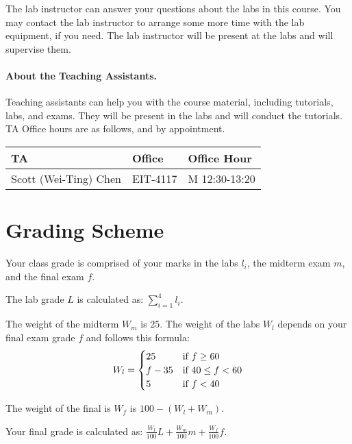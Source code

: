 \documentclass[letterpaper,10pt]{article}
\begin{document}
The lab instructor can answer your questions about the labs in this course. You may contact the lab instructor to arrange some more time with the lab equipment, if you need. The lab instructor will be present at the labs and will supervise them.

\paragraph{About the Teaching Assistants.}

Teaching assistants can help you with the course material, including tutorials, labs, and exams. They will be present in the labs and will conduct the tutorials. TA Office hours are as follows, and by appointment.

\begin{table}[h]
        \begin{center}
        \begin{tabular}{l|l|l}
        							\textbf{TA} & \textbf{Office} & \textbf{Office Hour} \\ \hline
									 Scott (Wei-Ting) Chen & EIT-4117 & M 12:30-13:20 \\
		\end{tabular}
        \end{center}
\end{table}
\vspace{-2em}

\section*{Grading Scheme}

Your class grade is comprised of your marks in the labs $l_{i}$, the midterm exam $m$, and the final exam $f$.

The lab grade $L$ is calculated as: $\sum_{i=1}^{4}l_{i}$.

The weight of the midterm $W_{m}$ is $25$. The weight of the labs $W_{l}$ depends on your final exam grade $f$ and follows this formula:
\[
 W_{l} = \begin{cases}
        25      & $if~$ f \ge 60\\
        f - 35  & $if~$ 40 \le f < 60\\
        5       & $if~$ f < 40
        \end{cases}
\]

The weight of the final is $W_{f}$ is $100 - (W_{l} + W_{m})$.

Your final grade is calculated as: $\frac{W_{l}}{100}L + \frac{W_{m}}{100}m + \frac{W_{f}}{100}f $.
\end{document}
